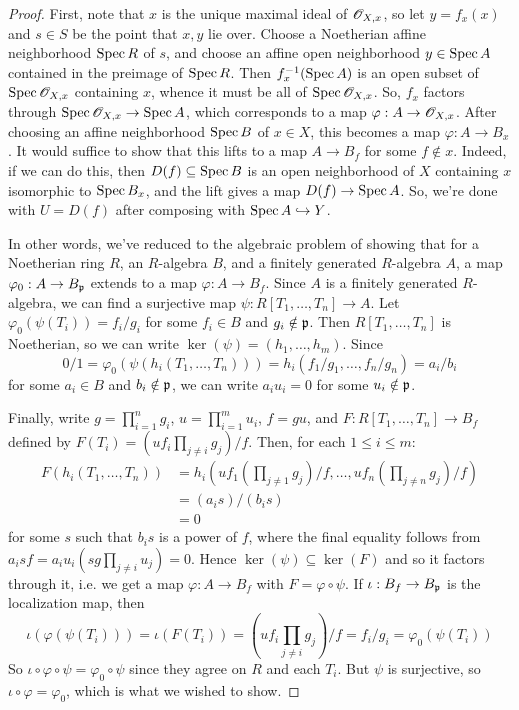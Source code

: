 \begin{proof}
	First, note that $x$ is the unique maximal ideal of $\mathscr{O}_{X,x}$, so let $y = f_x(x)$ and $s \in S$ be the point that $x,y$ lie over. Choose a Noetherian affine neighborhood $\operatorname{Spec} R$ of $s$, and choose an affine open neighborhood $y \in \operatorname{Spec} A$ contained in the preimage of $\operatorname{Spec} R$. Then $f_x^{-1}(\operatorname{Spec} A)$ is an open subset of $\operatorname{Spec} \mathscr{O}_{X,x}$ containing $x$, whence it must be all of $\operatorname{Spec} \mathscr{O}_{X,x}$. So, $f_x$ factors through $\operatorname{Spec} \mathscr{O}_{X,x} \to \operatorname{Spec} A$, which corresponds to a map $\varphi : A \to \mathscr{O}_{X,x}$. After choosing an affine neighborhood $\operatorname{Spec} B$ of $x \in X$, this becomes a map $\varphi : A \to B_x$. It would suffice to show that this lifts to a map $A \to B_f$ for some $f \notin x$. Indeed, if we can do this, then $D(f) \subseteq \operatorname{Spec} B$ is an open neighborhood of $X$ containing $x$ isomorphic to $\operatorname{Spec} B_x$, and the lift gives a map $D(f) \to \operatorname{Spec} A$. So, we're done with $U = D(f)$ after composing with $\operatorname{Spec} A \hookrightarrow Y$.
	
	In other words, we've reduced to the algebraic problem of showing that for a Noetherian ring $R$, an $R$-algebra $B$, and a finitely generated $R$-algebra $A$, a map $\varphi_0 : A \to B_{\mathfrak{p}}$ extends to a map $\varphi : A \to B_f$. Since $A$ is a finitely generated $R$-algebra, we can find a surjective map $\psi : R[T_1,\ldots,T_n] \to A$. Let $\varphi_0(\psi(T_i)) = f_i/g_i$ for some $f_i \in B$ and $g_i \notin \mathfrak{p}$. Then $R[T_1,\ldots,T_n]$ is Noetherian, so we can write $\ker(\psi) = (h_1,\ldots,h_m)$. Since
	\[ 0/1 = \varphi_0(\psi(h_i(T_1,\ldots,T_n))) = h_i(f_1/g_1,\ldots,f_n/g_n) = a_i/b_i \]
	for some $a_i \in B$ and $b_i \notin \mathfrak{p}$, we can write $a_iu_i = 0$ for some $u_i \notin \mathfrak{p}$. 
	
	Finally, write $g = \prod_{i=1}^n g_i$, $u = \prod_{i=1}^m u_i$, $f = gu$, and $F : R[T_1,\ldots,T_n] \to B_f$ defined by $F(T_i) = \left(uf_i\prod_{j \neq i} g_j\right)/f$. Then, for each $1 \leq i \leq m$:
	\begin{align*}
	F(h_i(T_1,\ldots,T_n))
		&= h_i\left(uf_1\left(\prod_{j \neq 1} g_j\right)/f,\ldots,uf_n\left(\prod_{j \neq n} g_j\right)/f\right) \\
		&= (a_is)/(b_is) \\
		&= 0
	\end{align*}
	for some $s$ such that $b_is$ is a power of $f$, where the final equality follows from $a_isf = a_iu_i\left(sg\prod_{j \neq i} u_j\right) = 0$. Hence $\ker(\psi) \subseteq \ker(F)$ and so it factors through it, i.e. we get a map $\varphi : A \to B_f$ with $F = \varphi \circ \psi$. If $\iota : B_f \to B_{\mathfrak{p}}$ is the localization map, then
	\[ \iota(\varphi(\psi(T_i))) = \iota(F(T_i)) = \left(uf_i\prod_{j \neq i} g_j\right)/f = f_i/g_i = \varphi_0(\psi(T_i)) \]
	So $\iota \circ \varphi \circ \psi = \varphi_0 \circ \psi$ since they agree on $R$ and each $T_i$. But $\psi$ is surjective, so $\iota \circ \varphi = \varphi_0$, which is what we wished to show.
\end{proof}
